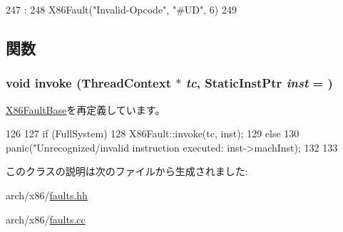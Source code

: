 \begin{DoxyCode}
247                         :
248             X86Fault("Invalid-Opcode", "#UD", 6)
249         {}

\end{DoxyCode}


\subsection{関数}
\hypertarget{classX86ISA_1_1InvalidOpcode_a2bd783b42262278d41157d428e1f8d6f}{
\subsubsection[{invoke}]{\setlength{\rightskip}{0pt plus 5cm}void invoke ({\bf ThreadContext} $\ast$ {\em tc}, \/  {\bf StaticInstPtr} {\em inst} = {})}}
\label{classX86ISA_1_1InvalidOpcode_a2bd783b42262278d41157d428e1f8d6f}


\hyperlink{classX86ISA_1_1X86FaultBase_a2bd783b42262278d41157d428e1f8d6f}{X86FaultBase}を再定義しています。


\begin{DoxyCode}
126     {
127         if (FullSystem) {
128             X86Fault::invoke(tc, inst);
129         } else {
130             panic("Unrecognized/invalid instruction executed:                     inst->machInst);
132         }
133     }
\end{DoxyCode}


このクラスの説明は次のファイルから生成されました:\begin{DoxyCompactItemize}
\item 
arch/x86/\hyperlink{arch_2x86_2faults_8hh}{faults.hh}\item 
arch/x86/\hyperlink{arch_2x86_2faults_8cc}{faults.cc}\end{DoxyCompactItemize}
